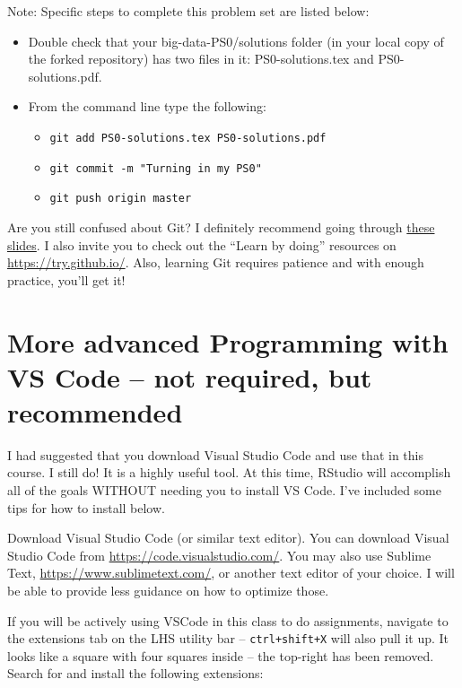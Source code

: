 \documentclass[12pt,english]{exam}
\begin{document}
Note: Specific steps to complete this problem set are listed below:
\begin{itemize}
\item Double check that your big-data-PS0/solutions folder (in your local copy of the forked repository) has two files in it: PS0-solutions.tex and PS0-solutions.pdf.
\item From the command line type the following:
    \begin{itemize}
    \item \texttt{git add PS0-solutions.tex PS0-solutions.pdf}
    \item \texttt{git commit -m "Turning in my PS0"}
    \item \texttt{git push origin master}
    \end{itemize}
\end{itemize}

Are you still confused about Git? I definitely recommend going through \href{https://raw.githack.com/uo-ec607/lectures/master/02-git/02-Git.html}{these slides}. I also invite you to check out the ``Learn by doing'' resources on \url{https://try.github.io/}. Also, learning Git requires patience and with enough practice, you'll get it!

\section{More advanced Programming with VS Code -- not required, but recommended}

I had suggested that you download Visual Studio Code and use that in this course. I still do! It is a highly useful tool. At this time, RStudio will accomplish all of the goals WITHOUT needing you to install VS Code. I've included some tips for how to install below. 

Download Visual Studio Code (or similar text editor). You can download Visual Studio Code from \url{https://code.visualstudio.com/}. You may also use Sublime Text, \url{https://www.sublimetext.com/}, or another text editor of your choice. I will be able to provide less guidance on how to optimize those. 

If you will be actively using VSCode in this class to do assignments, navigate to the extensions tab on the LHS utility bar -- \texttt{ctrl+shift+X} will also pull it up. It looks like a square with four squares inside -- the top-right has been removed. Search for and install the following extensions:
\end{document}
